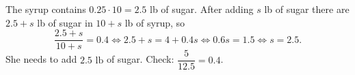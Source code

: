 The syrup contains $0.25\cdot10=2.5$ lb of sugar. After adding $s$ lb of sugar there are $2.5+s$ lb of sugar in $10+s$ lb of syrup, so
\[
\dfrac{2.5+s}{10+s}=0.4\iff2.5+s=4+0.4s\iff0.6s=1.5\iff s=2.5 .
\]
She needs to add $\boxed{2.5\text{ lb}}$ of sugar. Check: $\dfrac{5}{12.5}=0.4$.
